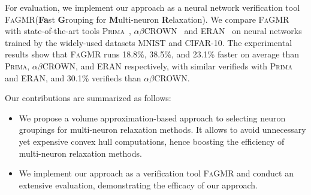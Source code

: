 \documentclass[runningheads]{llncs}
\newcommand{\ourtool}{\textsc{FaGMR}\xspace}
\newcommand{\prima}{\textsc{Prima}\xspace}
\newcommand{\mnist}{MNIST\xspace}
\newcommand{\cifar}{CIFAR-10\xspace}
\newcommand{\eran}{\textsc{ERAN}\xspace}
\newcommand{\abcrown}{\textsc{$\alpha$$\beta$CROWN}\xspace}
\begin{document}
For evaluation, we implement our approach as a neural network
verification tool \ourtool (\textbf{Fa}st \textbf{G}rouping for
\textbf{M}ulti-neuron \textbf{R}elaxation). We compare \ourtool with
state-of-the-art tools
\prima~\cite{DBLP:journals/pacmpl/MullerMSPV22},
\abcrown~\cite{DBLP:conf/iclr/XuZ0WJLH21} and \eran~\cite{ref_url4} on
neural networks trained by the widely-used datasets \mnist and \cifar.
The experimental results show that \ourtool runs 18.8\%, 38.5\%, and 23.1\%  
faster on average than \prima, \abcrown, and \eran respectively, with 
similar verifieds with \prima and \eran, and 30.1\% verifieds than \abcrown. 

Our contributions are summarized as follows:
\begin{itemize}
  \item We propose a volume approximation-based approach to selecting
    neuron groupings for multi-neuron relaxation methods. It allows to
    avoid unnecessary yet expensive convex hull computations, hence
    boosting the efficiency of multi-neuron relaxation methods.
  \item We implement our approach as a verification tool \ourtool and
    conduct an extensive evaluation, demonstrating the efficacy of our
    approach.
\end{itemize}
\end{document}
